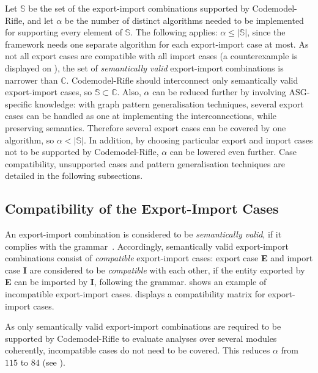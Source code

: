 Let $\mathbb{S}$ be the set of the export-import combinations supported by Codemodel-Rifle, and let $\alpha$ be the number of distinct algorithms needed to be implemented for supporting every element of $\mathbb{S}$. The following applies: $\alpha \leq |\mathbb{S}|$, since the framework needs one separate algorithm for each export-import case at most. As not all export cases are compatible with all import cases (a counterexample is displayed on ), the set of \emph{semantically valid} export-import combinations is narrower than $\mathbb{C}$. Codemodel-Rifle should interconnect only semantically valid export-import cases, so $\mathbb{S} \subset \mathbb{C}$. Also, $\alpha$ can be reduced further by involving ASG-specific knowledge: with graph pattern generalisation techniques, several export cases can be handled as one at implementing the interconnections, while preserving semantics. Therefore several export cases can be covered by one algorithm, so $\alpha < |\mathbb{S}|$. In addition, by choosing particular export and import cases not to be supported by Codemodel-Rifle, $\alpha$ can be lowered even further. Case compatibility, unsupported cases and pattern generalisation techniques are detailed in the following subsections.


\subsection{Compatibility of the Export-Import Cases}

An export-import combination is considered to be \emph{semantically valid}, if it complies with the \es grammar~\cite{export-grammar, import-grammar}. Accordingly, semantically valid export-import combinations consist of \emph{compatible} export-import cases: export case \textbf{E} and import case \textbf{I} are considered to be \emph{compatible} with each other, if the entity exported by \textbf{E} can be imported by \textbf{I}, following the \es grammar.  shows an example of incompatible export-import cases.  displays a compatibility matrix for \es export-import cases.

As only semantically valid export-import combinations are required to be supported by Codemodel-Rifle to evaluate analyses over several \es modules coherently, incompatible cases do not need to be covered. This reduces $\alpha$ from $115$ to $84$ (see ).


